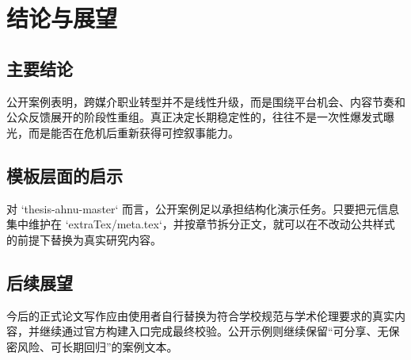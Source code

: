 \chapter{结论与展望}

\section{主要结论}

公开案例表明，跨媒介职业转型并不是线性升级，而是围绕平台机会、内容节奏和公众反馈展开的阶段性重组。真正决定长期稳定性的，往往不是一次性爆发式曝光，而是能否在危机后重新获得可控叙事能力。

\section{模板层面的启示}

对 `thesis-ahnu-master` 而言，公开案例足以承担结构化演示任务。只要把元信息集中维护在 `extraTex/meta.tex`，并按章节拆分正文，就可以在不改动公共样式的前提下替换为真实研究内容。

\section{后续展望}

今后的正式论文写作应由使用者自行替换为符合学校规范与学术伦理要求的真实内容，并继续通过官方构建入口完成最终校验。公开示例则继续保留“可分享、无保密风险、可长期回归”的案例文本。
